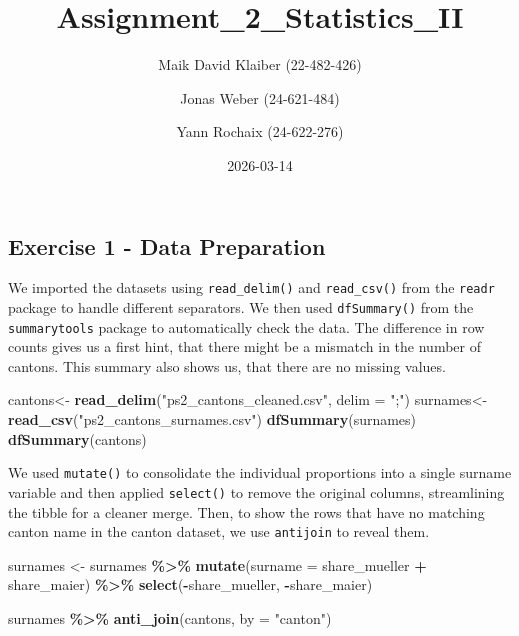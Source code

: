 \documentclass[
]{article}
\title{Assignment\_2\_Statistics\_II}
\author{Maik David Klaiber (22-482-426) \and Jonas Weber
(24-621-484) \and Yann Rochaix (24-622-276)}
\date{2026-03-14}
\newenvironment{Shaded}{\begin{snugshade}}{\end{snugshade}}
\newcommand{\AttributeTok}[1]{\textcolor[rgb]{0.13,0.29,0.53}{#1}}
\newcommand{\FunctionTok}[1]{\textcolor[rgb]{0.13,0.29,0.53}{\textbf{#1}}}
\newcommand{\NormalTok}[1]{#1}
\newcommand{\OtherTok}[1]{\textcolor[rgb]{0.56,0.35,0.01}{#1}}
\newcommand{\SpecialCharTok}[1]{\textcolor[rgb]{0.81,0.36,0.00}{\textbf{#1}}}
\newcommand{\StringTok}[1]{\textcolor[rgb]{0.31,0.60,0.02}{#1}}
\begin{document}
\maketitle

\subsection{Exercise 1 - Data
Preparation}\label{exercise-1---data-preparation}

We imported the datasets using \texttt{read\_delim()} and
\texttt{read\_csv()} from the \texttt{readr} package to handle different
separators. We then used \texttt{dfSummary()} from the
\texttt{summarytools} package to automatically check the data. The
difference in row counts gives us a first hint, that there might be a
mismatch in the number of cantons. This summary also shows us, that
there are no missing values.

\begin{Shaded}
\begin{Highlighting}[]
\NormalTok{cantons}\OtherTok{\textless{}{-}} \FunctionTok{read\_delim}\NormalTok{(}\StringTok{"ps2\_cantons\_cleaned.csv"}\NormalTok{, }\AttributeTok{delim =} \StringTok{";"}\NormalTok{)}
\NormalTok{surnames}\OtherTok{\textless{}{-}} \FunctionTok{read\_csv}\NormalTok{(}\StringTok{"ps2\_cantons\_surnames.csv"}\NormalTok{)}
\FunctionTok{dfSummary}\NormalTok{(surnames)}
\FunctionTok{dfSummary}\NormalTok{(cantons)}
\end{Highlighting}
\end{Shaded}

We used \texttt{mutate()} to consolidate the individual proportions into
a single surname variable and then applied \texttt{select()} to remove
the original columns, streamlining the tibble for a cleaner merge. Then,
to show the rows that have no matching canton name in the canton
dataset, we use \texttt{antijoin} to reveal them.

\begin{Shaded}
\begin{Highlighting}[]
\NormalTok{surnames }\OtherTok{\textless{}{-}}\NormalTok{ surnames }\SpecialCharTok{\%\textgreater{}\%}
  \FunctionTok{mutate}\NormalTok{(}\AttributeTok{surname =}\NormalTok{ share\_mueller }\SpecialCharTok{+}\NormalTok{ share\_maier) }\SpecialCharTok{\%\textgreater{}\%}
  \FunctionTok{select}\NormalTok{(}\SpecialCharTok{{-}}\NormalTok{share\_mueller, }\SpecialCharTok{{-}}\NormalTok{share\_maier)}

\NormalTok{surnames }\SpecialCharTok{\%\textgreater{}\%} 
  \FunctionTok{anti\_join}\NormalTok{(cantons, }\AttributeTok{by =} \StringTok{"canton"}\NormalTok{)}
\end{Highlighting}
\end{Shaded}
\end{document}
